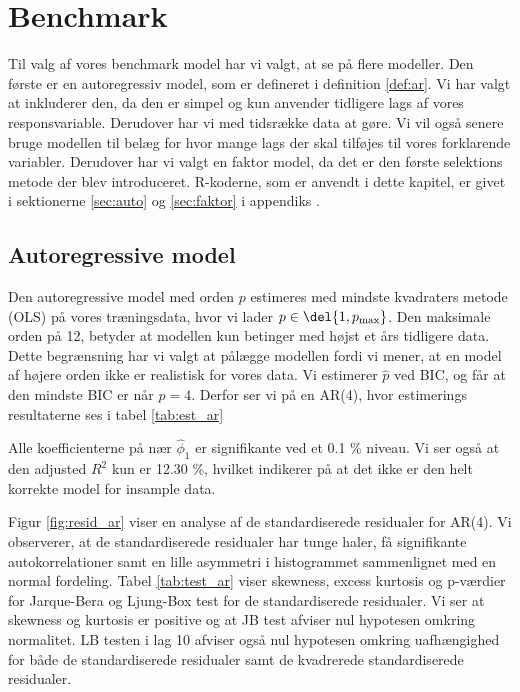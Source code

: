 \chapter{Benchmark}
Til valg af vores benchmark model har vi valgt, at se på flere modeller. 
Den første er en autoregressiv model, som er defineret  i definition \ref{def:ar}.
Vi har valgt at inkluderer den, da den er simpel og kun anvender tidligere lags af vores responsvariable. 
Derudover har vi med tidsrække data at gøre. 
Vi vil også senere bruge modellen til belæg for hvor mange lags der skal tilføjes til vores forklarende variabler. 
Derudover har vi valgt en faktor model, da det er den første selektions metode der blev introduceret. 
R-koderne, som er anvendt i dette kapitel, er givet i sektionerne \ref{sec:auto} og \ref{sec:faktor} i appendiks .

\section{Autoregressive model}
Den autoregressive model med orden $p$ estimeres med mindste kvadraters metode (OLS) på vores træningsdata, hvor vi lader $p \in \del{1, p_{\max}}$.
Den maksimale orden på 12, betyder at modellen kun betinger med højst et års tidligere data. 
Dette begrænsning har vi valgt at pålægge modellen fordi vi mener, at en model af højere orden ikke er realistisk for vores data. 
Vi estimerer $\widehat{p}$ ved BIC, og får at den mindste BIC er når $p = 4$. 
Derfor ser vi på en AR(4), hvor estimerings resultaterne ses i tabel \ref{tab:est_ar} 
%

%
Alle koefficienterne på nær $\widehat\phi_1$ er signifikante ved et 0.1 \% niveau. Vi ser også at den adjusted $R^2$ kun er 12.30 \%, hvilket indikerer på at det ikke er den helt korrekte model for insample data. 

Figur \ref{fig:resid_ar} viser en analyse af de standardiserede residualer for AR(4). 
Vi observerer, at de standardiserede residualer har tunge haler, få signifikante autokorrelationer samt en lille asymmetri i histogrammet sammenlignet med en normal fordeling.
Tabel \ref{tab:test_ar} viser skewness, excess kurtosis og p-værdier for Jarque-Bera og Ljung-Box test for de standardiserede residualer. Vi ser at skewness og kurtosis er positive og at JB test afviser nul hypotesen omkring normalitet. LB testen i lag 10 afviser også nul hypotesen omkring uafhængighed for både de standardiserede residualer samt de kvadrerede standardiserede residualer. 
%
 

